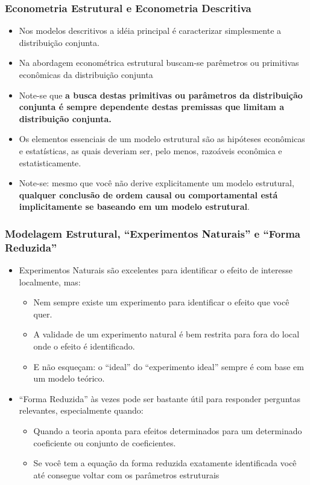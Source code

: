 \documentclass{beamer}
\begin{document}
\begin{frame}[fragile]\frametitle{Econometria Estrutural e Econometria Descritiva}
\small
  \begin{itemize}
      \item Nos modelos descritivos a idéia principal é caracterizar simplesmente a distribuição conjunta. 
      \item Na abordagem econométrica estrutural buscam-se parêmetros ou primitivas econômicas da distribuição conjunta
      \item Note-se que \textbf{a busca destas primitivas ou parâmetros da distribuição conjunta é sempre dependente destas
premissas que limitam a distribuição conjunta.} 
      \item Os elementos essenciais de um modelo estrutural são as hipóteses econômicas e estatísticas, as quais deveriam ser, pelo menos, razoáveis econômica e estatisticamente. 
      \item Note-se: mesmo que você não derive explicitamente um modelo estrutural, \textbf{qualquer conclusão de ordem causal ou
comportamental está implicitamente se baseando em um modelo estrutural}.
    \end{itemize}    
\end{frame}

\begin{frame}[fragile]\frametitle{Modelagem Estrutural, ``Experimentos Naturais'' e ``Forma Reduzida''}
\begin{itemize}
	\item Experimentos Naturais são excelentes para identificar o efeito de interesse localmente, mas:
	\begin{itemize}
		\item Nem sempre existe um experimento para identificar o efeito que você quer.
		\item A validade de um experimento natural é bem restrita para fora do local onde o efeito é identificado.
		\item E não esqueçam: o ``ideal'' do ``experimento ideal'' sempre é com base em um modelo teórico.
	\end{itemize}
	\item ``Forma Reduzida'' às vezes pode ser bastante útil para responder perguntas relevantes, especialmente quando:
	\begin{itemize}
		\item Quando a teoria aponta para efeitos determinados para um determinado coeficiente ou conjunto de coeficientes.
		\item Se você tem a equação da forma reduzida exatamente identificada você até consegue voltar com os parâmetros estruturais
	\end{itemize}
\end{itemize}
    


\end{frame}
\end{document}
